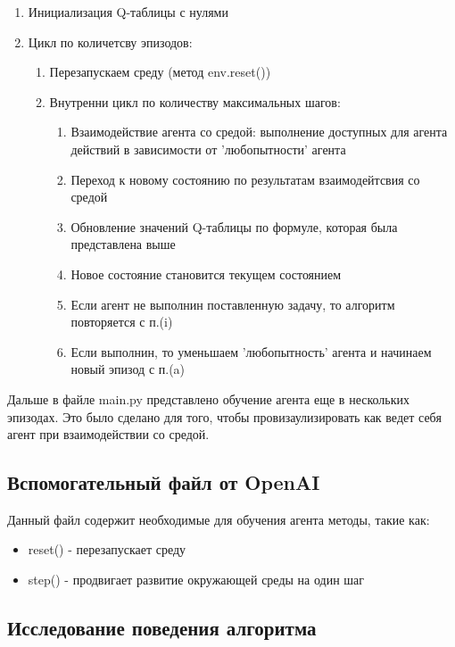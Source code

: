 \documentclass[a4paper]{report}
\theoremstyle{definition}
\theoremstyle{plain}
\theoremstyle{remark}
\theoremstyle{remark}
\theoremstyle{definition}
\begin{document}
\begin{enumerate}
    \item Инициализация Q-таблицы с нулями
    \item Цикл по количетсву эпизодов:
    \begin{enumerate}
        \item Перезапускаем среду (метод env.reset())
        \item Внутренни цикл по количеству максимальных шагов:
        \begin{enumerate}
            \item Взаимодействие агента со средой: выполнение доступных для агента действий в зависимости от 'любопытности' агента
            \item Переход к новому состоянию по результатам взаимодейтсвия со средой
            \item Обновление значений Q-таблицы по формуле, которая была представлена выше
            \item Новое состояние становится текущем состоянием
            \item Если агент не выполнин поставленную задачу, то алгоритм повторяется с п.(i)
            \item Если выполнин, то уменьшаем 'любопытность' агента и начинаем новый эпизод с п.(a)
        \end{enumerate}
    \end{enumerate}
\end{enumerate}

Дальше в файле main.py представлено обучение агента еще в нескольких эпизодах. Это было сделано для того, чтобы провизаулизировать как ведет себя агент при взаимодействии со средой.
\begin{center}
    \subsection{Вспомогательный файл от OpenAI}
\end{center}
Данный файл содержит необходимые для обучения агента методы, такие как:
\begin{itemize}
    \item reset() - перезапускает среду
    \item step() - продвигает развитие окружающей среды на один шаг
\end{itemize}

\newpage
\begin{center}
\section{Исследование поведения алгоритма}
\end{center}
\end{document}
